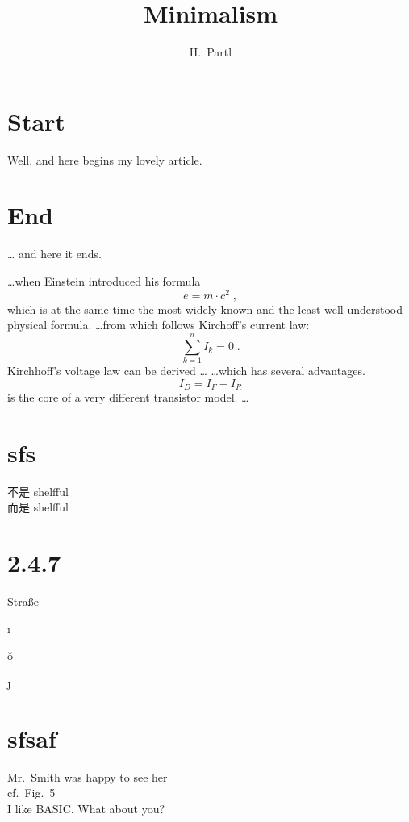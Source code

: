 \documentclass[UTF8]{ctexart}
\author{H.~Partl}
\title{Minimalism}
\begin{document}
\maketitle
\tableofcontents
\section{Start}
Well, and here begins my lovely article.

\section{End}
\ldots{} and here it ends.

\ldots when Einstein introduced his formula
\begin{equation}
e = m \cdot c^2 \; ,
\end{equation}
which is at the same time the most widely known
and the least well understood physical formula.
\ldots from which follows Kirchoff’s current law:
\begin{equation}
\sum_{k=1}^{n} I_k = 0 \; .
\end{equation}
Kirchhoff’s voltage law can be derived \ldots
\ldots which has several advantages.
\begin{equation}
I_D = I_F - I_R
\end{equation}
is the core of a very different transistor model. \ldots

\section{sfs}

不是%
shelfful\\
而是%
shelf\mbox{}ful

\section{2.4.7}

Stra\ss e

\i



\u o

\TU

\j

\section{sfsaf}

Mr.~Smith was happy to see her\\
cf.~Fig.~5\\
I like BASIC\@. What about you?
\end{document}
